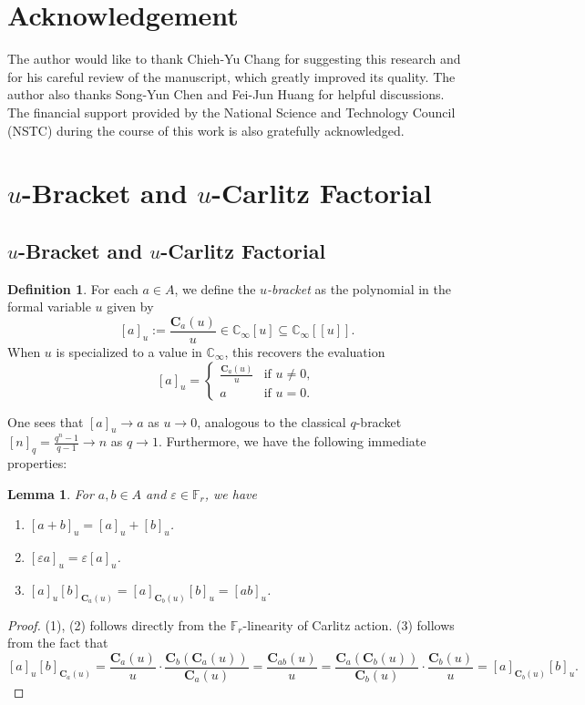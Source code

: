 \documentclass[12pt,reqno]{amsart}
\numberwithin{equation}{section}
\theoremstyle{plain}
\newtheorem{lem}[thm]{Lemma}
\theoremstyle{definition}
\newtheorem{df}[thm]{Definition}
\theoremstyle{remark}
\newcommand{\CC}{\mathbb{C}}
\newcommand{\FF}{\mathbb{F}}
\let\subset\subseteq
\newcommand{\mbb}[1]{[\![{#1}]\!]}
\newcommand{\C}{\mathbf{C}}
\begin{document}
\section*{Acknowledgement}
The author would like to thank Chieh-Yu Chang for suggesting this research and for his careful review of the manuscript, which greatly improved its quality. The author also thanks Song-Yun Chen and Fei-Jun Huang for helpful discussions. The financial support provided by the National Science and Technology Council (NSTC) during the course of this work is also gratefully acknowledged.
\section{\texorpdfstring{$u$}{u}-Bracket and \texorpdfstring{$u$}{u}-Carlitz Factorial}\label{section:2}
\subsection{\texorpdfstring{$u$}{u}-Bracket and \texorpdfstring{$u$}{u}-Carlitz Factorial}\label{section:2.1}
\begin{df}\label{df-u-bracket}
    For each $a \in A$, we define the \textit{$u$-bracket} as the polynomial in the formal variable $u$ given by
    $$
    [a]_u := \frac{\C_a(u)}{u} \in \CC_\infty[u]\subset\CC_\infty\mbb{u}.
    $$
    When $u$ is specialized to a value in $\CC_\infty$, this recovers the evaluation
    $$
    [a]_u = 
    \begin{cases} 
    \frac{\C_a(u)}{u} & \text{if } u \neq 0, 
    \\ a & \text{if } u = 0. 
    \end{cases}
    $$
\end{df}

One sees that $[a]_u \to a$ as $u \to 0$, analogous to the classical $q$-bracket $[n]_q = \frac{q^n-1}{q-1} \to n$ as $q \to 1$. Furthermore, we have the following immediate properties:
\begin{lem}\label{lem-Fq-linear-u-bracket}
    For $a,b\in A$ and $\varepsilon\in\FF_r$, we have
    \begin{enumerate}
        \item $[a+b]_u=[a]_u+[b]_u$.
        \item $[\varepsilon a]_u=\varepsilon[a]_u$.
        \item $[a]_u[b]_{\C_a(u)}=[a]_{\C_b(u)}[b]_u=[ab]_u$.
    \end{enumerate}
\end{lem}
\begin{proof}
    (1), (2) follows directly from the $\FF_r$-linearity of Carlitz action. (3) follows from the fact that
    $$[a]_u[b]_{\C_a(u)}=\frac{\C_a(u)}{u}\cdot\frac{\C_b(\C_a(u))}{\C_a(u)}=\frac{\C_{ab}(u)}{u}=\frac{\C_a(\C_b(u))}{\C_b(u)}\cdot\frac{\C_b(u)}{u}=[a]_{\C_b(u)}[b]_u.$$
\end{proof}
\end{document}
